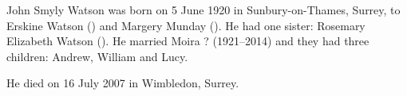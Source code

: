 
John Smyly Watson was born on 5 June 1920 in	Sunbury-on-Thames, Surrey, to Erskine Watson () and
Margery Munday (). He had one sister:  Rosemary Elizabeth Watson ().
He married Moira ? (1921--2014) and they had three children: Andrew, William and Lucy.

He died on 16 July 2007 in Wimbledon, Surrey.
